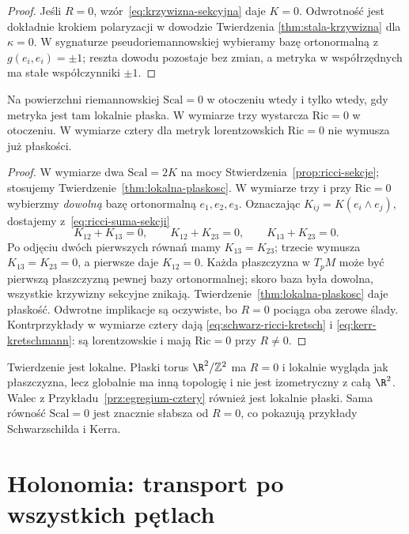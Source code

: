 \begin{proof}
Jeśli $R=0$, wzór~\eqref{eq:krzywizna-sekcyjna}
daje $K=0$. Odwrotność jest dokładnie krokiem
polaryzacji w dowodzie Twierdzenia
\ref{thm:stala-krzywizna} dla $\kappa=0$.
W sygnaturze pseudoriemannowskiej wybieramy
bazę ortonormalną z $g(e_i,e_i)=\pm1$; reszta
dowodu pozostaje bez zmian, a metryka w
współrzędnych ma stałe współczynniki $\pm1$.
\end{proof}

\begin{wniosek}
\label{cor:ricci-plaskosc-3d}
Na powierzchni riemannowskiej $\mathrm{Scal}=0$
w otoczeniu wtedy i tylko wtedy, gdy metryka jest
tam lokalnie płaska. W wymiarze trzy wystarcza
$\mathrm{Ric}=0$ w otoczeniu. W wymiarze cztery
dla metryk lorentzowskich $\mathrm{Ric}=0$
nie wymusza już płaskości.
\end{wniosek}
\begin{proof}
W wymiarze dwa $\mathrm{Scal}=2K$ na mocy
Stwierdzenia~\ref{prop:ricci-sekcje}; stosujemy
Twierdzenie~\ref{thm:lokalna-plaskosc}.
W wymiarze trzy i przy $\mathrm{Ric}=0$ wybierzmy
\emph{dowolną} bazę ortonormalną $e_1,e_2,e_3$.
Oznaczając $K_{ij}=K(e_i\wedge e_j)$, dostajemy
z~\eqref{eq:ricci-suma-sekcji}
\[
 K_{12}+K_{13}=0,\qquad
 K_{12}+K_{23}=0,\qquad
 K_{13}+K_{23}=0.
\]
Po odjęciu dwóch pierwszych równań mamy
$K_{13}=K_{23}$; trzecie wymusza
$K_{13}=K_{23}=0$, a pierwsze daje $K_{12}=0$.
Każda płaszczyzna w $T_pM$ może być pierwszą
płaszczyzną pewnej bazy ortonormalnej; skoro
baza była dowolna, wszystkie krzywizny sekcyjne
znikają. Twierdzenie~\ref{thm:lokalna-plaskosc}
daje płaskość. Odwrotne implikacje są oczywiste,
bo $R=0$ pociąga oba zerowe ślady.
Kontrprzykłady w wymiarze cztery dają
\eqref{eq:schwarz-ricci-kretsch} i
\eqref{eq:kerr-kretschmann}: są lorentzowskie
i mają $\mathrm{Ric}=0$ przy $R\ne0$.
\end{proof}

\begin{uwaga}
Twierdzenie jest lokalne. Płaski torus
$\R^2/\mathbb Z^2$ ma $R=0$ i lokalnie wygląda
jak płaszczyzna, lecz globalnie ma inną topologię
i nie jest izometryczny z całą $\R^2$.
Walec z Przykładu~\ref{prz:egregium-cztery}
również jest lokalnie płaski. Sama równość
$\mathrm{Scal}=0$ jest znacznie słabsza od
$R=0$, co pokazują przykłady Schwarzschilda
i Kerra.
\end{uwaga}

\section{Holonomia: transport po wszystkich pętlach}
\label{sec:holonomia}

